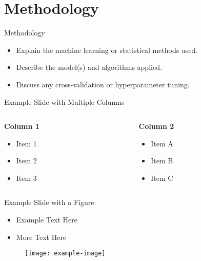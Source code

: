 \documentclass{beamer}
\begin{document}
\section{Methodology}

\begin{frame}{Methodology}
\begin{itemize}
  \item Explain the machine learning or statistical methods used.
  \item Describe the model(s) and algorithms applied.
  \item Discuss any cross-validation or hyperparameter tuning.
\end{itemize}
\end{frame}

\begin{frame}{Example Slide with Multiple Columns}
\begin{columns}[T] %
\begin{column}{0.5\textwidth} %
  \textbf{Column 1}
  \begin{itemize}
    \item Item 1
    \item Item 2
    \item Item 3
  \end{itemize}
\end{column}
\begin{column}{0.5\textwidth} %
  \textbf{Column 2}
  \begin{itemize}
    \item Item A
    \item Item B
    \item Item C
  \end{itemize}
\end{column}
\end{columns}
\end{frame}


\begin{frame}{Example Slide with a Figure}
  \begin{center}
    \begin{itemize}
        \item Example Text Here
        \item More Text Here
    \end{itemize}

    \begin{figure}
      \centering
      \texttt{[image: example-image]} %
    \end{figure}

    \vspace{0.1cm}

  \end{center}
\end{frame}
\end{document}

